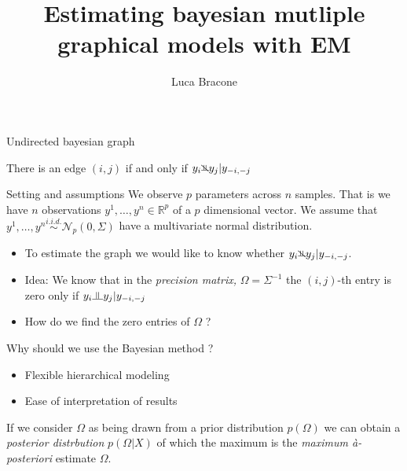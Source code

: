 \documentclass{beamer}
\title{Estimating bayesian mutliple graphical models with EM}
\author{Luca Bracone}
\newcommand{\indep}{\raisebox{0.05em}{\rotatebox[origin=c]{90}{$\models$}}}
\newcommand{\nindep}{{\rotatebox[origin=c]{90}{$\nvDash$}}}
\begin{document}
\begin{frame}
	\titlepage
\end{frame}

\begin{frame}{Undirected bayesian graph}
	\begin{center}
	\end{center}
	There is an edge $(i,j)$ if and only if $y_i \nindep y_j | y_{-i, -j}$
\end{frame}
\begin{frame}{Setting and assumptions}
	We observe $p$ parameters across $n$ samples. That is we have
	$n$ observations $y^1, \dots, y^n \in \mathbb{R}^p$ of a $p$ dimensional
	vector. We assume that $y^1, \dots, y^n \stackrel{i.i.d.}{\sim}
		\mathcal{N}_p(0, \Sigma)$ have a multivariate normal distribution.
	\begin{itemize}
		\item To estimate the graph we would like to know whether $y_i \nindep
			      y_j | y_{-i,-j}$.
		\item Idea: We know that in the \emph{precision matrix,} $\Omega =
			      \Sigma^{-1}$ the $(i,j)$-th entry is zero only if $y_i \indep y_j |
			      y_{-i, -j}$
		\item How do we find the zero entries of $\Omega$ ?
	\end{itemize}
\end{frame}
\begin{frame}{Why should we use the Bayesian method ?}
	\begin{itemize}
		\item Flexible hierarchical modeling
		\item Ease of interpretation of results
	\end{itemize}
	If we consider $\Omega$ as being drawn from a prior distribution
	$p(\Omega)$ we can obtain a \emph{posterior distrbution} $p(\Omega | X)$
	of which the maximum is the \emph{maximum à-posteriori} estimate
	$\Omega$.
\end{frame}
\end{document}
